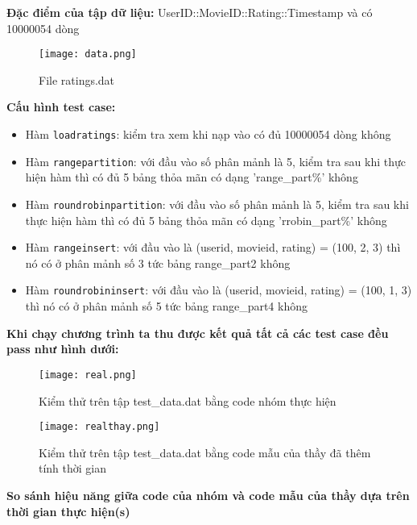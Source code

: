 \documentclass[14pt]{extarticle}
\begin{document}
\textbf{Đặc điểm của tập dữ liệu:} UserID::MovieID::Rating::Timestamp và có 10000054 dòng\\
\begin{figure}[H]
    \centering
    \texttt{[image: data.png]}
    \caption{File ratings.dat}

\end{figure}
\textbf{Cấu hình test case:}
\begin{itemize}
    \item Hàm \texttt{loadratings}: kiểm tra xem khi nạp vào có đủ 10000054 dòng không
    \item Hàm \texttt{rangepartition}: với đầu vào số phân mảnh là 5, kiểm tra sau khi thực hiện hàm thì có đủ 5 bảng thỏa mãn có dạng 'range\_part\%' không
    \item Hàm \texttt{roundrobinpartition}: với đầu vào số phân mảnh là 5, kiểm tra sau khi thực hiện hàm thì có đủ 5 bảng thỏa mãn có dạng 'rrobin\_part\%' không
    \item Hàm \texttt{rangeinsert}: với đầu vào là (userid, movieid, rating) = (100, 2, 3) thì nó có ở phân mảnh số 3 tức bảng range\_part2 không
    \item Hàm \texttt{roundrobininsert}: với đầu vào là (userid, movieid, rating) = (100, 1, 3) thì nó có ở phân mảnh số 5 tức bảng range\_part4 không
\end{itemize}
\textbf{Khi chạy chương trình ta thu được kết quả tất cả các test case đều pass như hình dưới:}
\begin{figure}[H]
    \centering
    \texttt{[image: real.png]}
    \caption{Kiểm thử trên tập test\_data.dat bằng code nhóm thực hiện}
    

\end{figure}
\begin{figure}[H]
    \centering
    \texttt{[image: realthay.png]}
    \caption{Kiểm thử trên tập test\_data.dat bằng code mẫu của thầy đã thêm tính thời gian}
    

\end{figure}
\textbf{So sánh hiệu năng giữa code của nhóm và code mẫu của thầy dựa trên thời gian thực hiện(s)}
\end{document}
